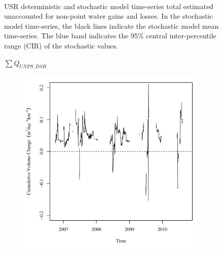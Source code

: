 \begin{linenumbers}
\begin{landscape}
\begin{figure}
\begin{subfigure}{0.7\textwidth}
		\end{subfigure}\\
		\caption[USR deterministic and stochastic model time-series total estimated unaccounted for non-point water gains and losses.]{USR deterministic and stochastic model time-series total estimated unaccounted for non-point water gains and losses.  In the stochastic model time-series, the black lines indicate the stochastic model mean time-series.  The blue band indicates the 95\% central inter-percentile range (CIR) of the stochastic values.}
		\label{fig:reachWater_US}
	\end{figure}
\end{landscape}
\subfiguretop
\begin{landscape}
	\begin{figure}
		\centering
		$ \displaystyle \sum Q_{UNPS,DSR} $
		\begin{subfigure}{0.7\textwidth}
			\centering
			\includegraphics[width=\tableCustomSize]{"Figures/Results_DSR/Deterministic/Balance Water"}
		\end{subfigure}%
		\begin{subfigure}{0.7\textwidth}
			\centering

\end{subfigure}
\end{figure}
\end{landscape}
\end{linenumbers}
